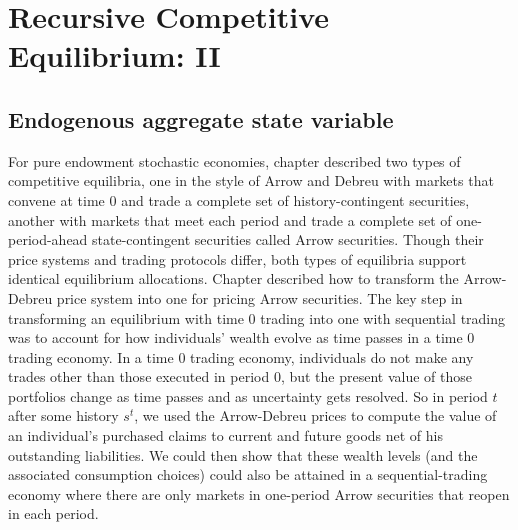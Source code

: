 



%
%
%
%
%








\def\sumst{{\sum_{t=0}^\infty \sum_{s^t}}}
\def\Ast{{A_t(s^t)}}
\def\cst{{c_t(s^t)}}
\def\kst{{k_t(s^{t-1})}}
\def\kstone{{k_{t+1}(s^t)}}
\def\nst{{n_t(s^t)}}
\def\xst{{x_t(s^t)}}
\def\qst{{q_t^0(s^t)}}
\def\qstone{{q_{t-1}^0(s^{t-1})}}
\def\wst{{w_t^0(s^t)}}
\def\rst{{r_t^0(s^t)}}
\def\rstilde{{r_t^0(\tilde s^t)}}
\def\pist{{\pi_t(s^t)}}
\def\must{{\mu_t(s^t)}}
\def\mustone{{\mu_{t+1}(s^{t+1})}}

\def\thetast{{\theta_{t}(s^{t})}}
\def\thetastilde{{\theta_{t}(\tilde s^{t})}}
\def\thetastone{{\theta_{t-1}(s^{t-1})}}
\def\lhake{{\Bigl[}}




\chapter{Recursive Competitive Equilibrium: II\label{growth1}}
\section{Endogenous aggregate state variable}  %
For pure endowment stochastic economies, chapter   described
two types of competitive equilibria, one  in the style of Arrow and Debreu
with markets that convene
at time $0$ and trade
a complete set of history-contingent securities, another with markets
that meet each period and trade a complete set
of one-period-ahead state-contingent securities called  Arrow
securities.  Though their price systems and trading protocols
differ, both types of equilibria support identical
equilibrium allocations.
Chapter  described how to transform the Arrow-Debreu price
system into one for pricing Arrow securities.
 The key
step in transforming an equilibrium with time $0$ trading into one
with sequential trading was to account for how individuals' wealth
evolve as time passes in a time $0$ trading economy.
In a time $0$ trading economy, individuals do not make any
 trades other than those executed in period $0$, but the present
value of those portfolios change as time passes and as uncertainty gets
resolved.
So in period $t$ after some history $s^t$, we used the Arrow-Debreu
prices to compute the value of an individual's purchased
claims to current and future goods net of his outstanding liabilities.
We could then show that these wealth levels (and the
associated consumption choices) could also be attained in a sequential-trading
economy where there are only markets in one-period Arrow securities that reopen in each period.



